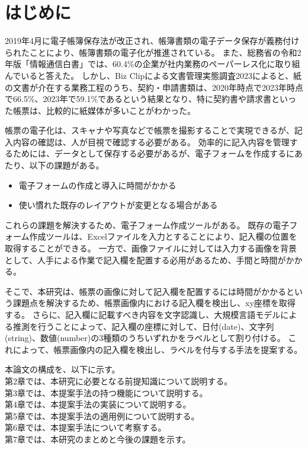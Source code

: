 \chapter{はじめに}\label{cha:Introduction}
2019年4月に電子帳簿保存法が改正され、帳簿書類の電子データ保存が義務付けられたことにより、帳簿書類の電子化が推進されている\cite{電子帳簿保存法}。
また、総務省の令和2年版「情報通信白書」では、60.4\%の企業が社内業務のペーパーレス化に取り組んでいると答えた\cite{デジタルデータの経済的価値の計測と活用の現状に関する調査研究}。
しかし、Biz Clip\cite{Biz Clip}による文書管理実態調査2023によると、紙の文書が介在する業務工程のうち、契約・申請書類は、2020年時点で2023年時点で66.5\%、2023年で59.1\%であるという結果となり、特に契約書や請求書といった帳票\cite{帳票}は、比較的に紙媒体が多いことがわかった。

帳票の電子化は、スキャナや写真などで帳票を撮影することで実現できるが、記入内容の確認は、人が目視で確認する必要がある。
効率的に記入内容を管理するためには、データとして保存する必要があるが、電子フォームを作成するにあたり、以下の課題がある。

\begin{itemize}
  \item 電子フォームの作成と導入に時間がかかる
  \item 使い慣れた既存のレイアウトが変更となる場合がある
\end{itemize}

これらの課題を解決するため、電子フォーム作成ツールがある。
既存の電子フォーム作成ツール\cite{Create!Form}\cite{i-Reporter}は、Excelファイルを入力とすることにより、記入欄の位置を取得することができる。
一方で、画像ファイルに対しては入力する画像を背景として、人手による作業で記入欄を配置する必用があるため、手間と時間がかかる。

そこで、本研究は、帳票の画像に対して記入欄を配置するには時間がかかるという課題点を解決するため、帳票画像内における記入欄を検出し、xy座標を取得する。
さらに、記入欄に記載すべき内容を文字認識し、大規模言語モデルによる推測を行うことによって、記入欄の座標に対して、日付(date)、文字列(string)、数値(number)の3種類のうちいずれかをラベルとして割り付ける。
これによって、帳票画像内の記入欄を検出し、ラベルを付与する手法を提案する。

本論文の構成を、以下に示す。\\
第2章では、本研究に必要となる前提知識について説明する。\\
第3章では、本提案手法の持つ機能について説明する。\\
第4章では、本提案手法の実装について説明する。\\
第5章では、本提案手法の適用例について説明する。\\
第6章では、本提案手法について考察する。\\
第7章では、本研究のまとめと今後の課題を示す。
